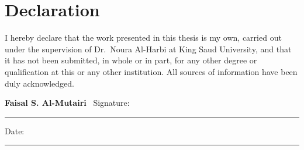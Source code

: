 \chapter*{Declaration}
\thispagestyle{empty}

\begin{tcolorbox}[colback=paperCream, colframe=ksuGreen, boxrule=0.8pt,
  arc=2pt, left=12pt, right=12pt, top=10pt, bottom=10pt]
I hereby declare that the work presented in this thesis is my own, carried
out under the supervision of Dr.\ Noura Al-Harbi at King Saud University, and
that it has not been submitted, in whole or in part, for any other degree or
qualification at this or any other institution. All sources of information
have been duly acknowledged.
\end{tcolorbox}

\vspace{28pt}
\noindent\textbf{Faisal S. Al-Mutairi} \hfill \faPen\ Signature: \rule{3cm}{0.4pt}

\noindent Date: \rule{4cm}{0.4pt}


